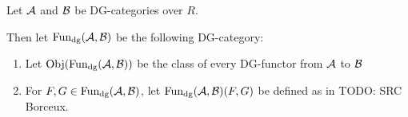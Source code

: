     

\begin{definition}[\( \Fun_{\dg}(\Ac, \Bc) \)]
    \label{def:dg_functor_category}
    Let \( {\mathcal{A}} \) and \( {\mathcal{B}} \) be DG-categories over \( R \).

    Then let \( \Fun_{\dg}(\Ac, \Bc) \) be the following DG-category:
    \begin{enumerate}
        \item{
            Let \( \operatorname{Obj}(\operatorname{Fun}_{\operatorname{dg}}({\mathcal{A}}, {\mathcal{B}})) \) be the class of every DG-functor from \( {\mathcal{A}} \) to \( {\mathcal{B}} \)
        }
        \item{
            For \( F, G \in \operatorname{Fun}_{\operatorname{dg}}({\mathcal{A}}, {\mathcal{B}}) \), let \( \operatorname{Fun}_{\operatorname{dg}}({\mathcal{A}}, {\mathcal{B}})(F, G) \) be defined as in TODO: SRC Borceux.
            

}
\end{enumerate}
\end{definition}
